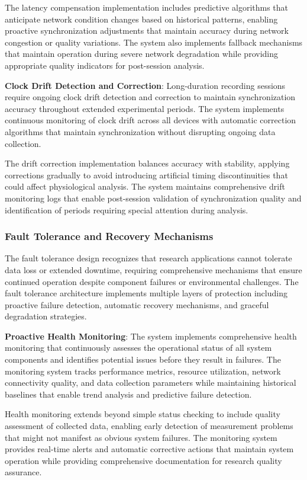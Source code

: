 \documentclass[12pt,a4paper]{article}
\begin{document}
The latency compensation implementation includes predictive algorithms that anticipate network condition changes based
on historical patterns, enabling proactive synchronization adjustments that maintain accuracy during network congestion
or quality variations. The system also implements fallback mechanisms that maintain operation during severe network
degradation while providing appropriate quality indicators for post-session analysis.

\textbf{Clock Drift Detection and Correction}: Long-duration recording sessions require ongoing clock drift detection and
correction to maintain synchronization accuracy throughout extended experimental periods. The system implements
continuous monitoring of clock drift across all devices with automatic correction algorithms that maintain
synchronization without disrupting ongoing data collection.

The drift correction implementation balances accuracy with stability, applying corrections gradually to avoid
introducing artificial timing discontinuities that could affect physiological analysis. The system maintains
comprehensive drift monitoring logs that enable post-session validation of synchronization quality and identification of
periods requiring special attention during analysis.

\subsubsection{Fault Tolerance and Recovery Mechanisms}

The fault tolerance design recognizes that research applications cannot tolerate data loss or extended downtime,
requiring comprehensive mechanisms that ensure continued operation despite component failures or environmental
challenges. The fault tolerance architecture implements multiple layers of protection including proactive failure
detection, automatic recovery mechanisms, and graceful degradation strategies.

\textbf{Proactive Health Monitoring}: The system implements comprehensive health monitoring that continuously assesses the
operational status of all system components and identifies potential issues before they result in failures. The
monitoring system tracks performance metrics, resource utilization, network connectivity quality, and data collection
parameters while maintaining historical baselines that enable trend analysis and predictive failure detection.

Health monitoring extends beyond simple status checking to include quality assessment of collected data, enabling early
detection of measurement problems that might not manifest as obvious system failures. The monitoring system provides
real-time alerts and automatic corrective actions that maintain system operation while providing comprehensive
documentation for research quality assurance.
\end{document}

